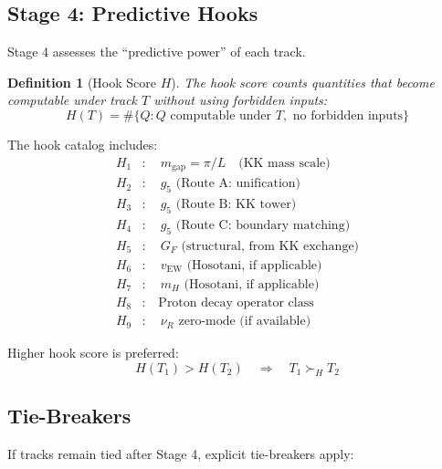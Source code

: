 \documentclass[11pt,a4paper]{article}
\newtheorem{definition}{Definition}[section]
\begin{document}
\subsection{Stage 4: Predictive Hooks}
\label{subsec:stage4}

Stage 4 assesses the ``predictive power'' of each track.

\begin{definition}[Hook Score $H$]
\label{def:hook-score}
The hook score counts quantities that become computable under track $T$
without using forbidden inputs:
\begin{equation}
\label{eq:hook-score}
H(T) = \#\{Q : Q \text{ computable under } T, \text{ no forbidden inputs}\}
\end{equation}
\end{definition}

The hook catalog includes:
\begin{align}
\label{eq:hook-mgap}
H_1&: \quad m_{\text{gap}} = \pi/L \quad \text{(KK mass scale)} \\
\label{eq:hook-g5a}
H_2&: \quad g_5 \text{ (Route A: unification)} \\
\label{eq:hook-g5b}
H_3&: \quad g_5 \text{ (Route B: KK tower)} \\
\label{eq:hook-g5c}
H_4&: \quad g_5 \text{ (Route C: boundary matching)} \\
\label{eq:hook-gf}
H_5&: \quad G_F \text{ (structural, from KK exchange)} \\
\label{eq:hook-vew}
H_6&: \quad v_{\text{EW}} \text{ (Hosotani, if applicable)} \\
\label{eq:hook-mh}
H_7&: \quad m_H \text{ (Hosotani, if applicable)} \\
\label{eq:hook-proton}
H_8&: \quad \text{Proton decay operator class} \\
\label{eq:hook-nu}
H_9&: \quad \nu_R \text{ zero-mode (if available)}
\end{align}

Higher hook score is preferred:
\begin{equation}
\label{eq:hook-ordering}
H(T_1) > H(T_2) \quad \Rightarrow \quad T_1 \succ_{H} T_2
\end{equation}

\subsection{Tie-Breakers}
\label{subsec:tiebreakers}

If tracks remain tied after Stage 4, explicit tie-breakers apply:
\end{document}
